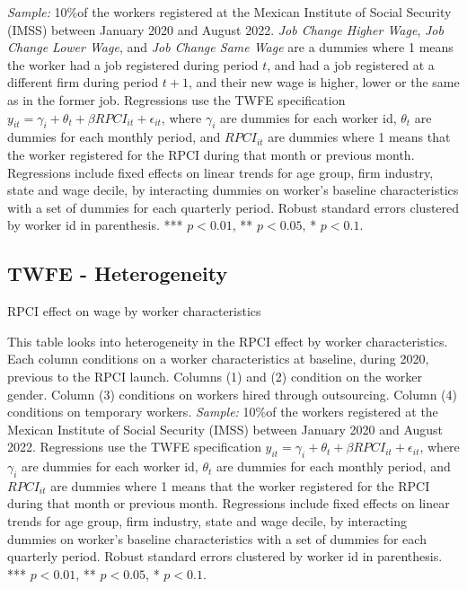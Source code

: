 \documentclass[oneside,11pt]{article}
\begin{document}
\scriptsize{
\noindent \textit{Sample:} 10\%of the workers registered at the Mexican Institute of Social Security (IMSS) between January 2020 and August 2022. \textit{Job Change Higher Wage}, \textit{Job Change Lower Wage}, and \textit{Job Change Same Wage} are a dummies where 1 means the worker had a job registered during period $t$, and had a job registered at a different firm during period $t+1$, and their new wage is higher, lower or the same as in the former job. Regressions use the TWFE specification $y_{it} = \gamma_{i} + \theta_{t}+ \beta RPCI_{it} +\epsilon_{it}$, where $\gamma_{i}$ are dummies for each worker id, $\theta_{t}$ are dummies for each monthly period, and $RPCI_{it}$ are dummies where 1 means that the worker registered for the RPCI during that month or previous month. Regressions include fixed effects on linear trends for age group, firm industry, state and wage decile, by interacting dummies on worker's baseline characteristics with a set of dummies for each quarterly period. Robust standard errors clustered by worker id in parenthesis. *** $p<0.01$, ** $p<0.05$, * $p<0.1$.
}

\clearpage

\subsection{TWFE - Heterogeneity}

\begin{table}[H]
    \caption{RPCI effect on wage by worker characteristics}
    \label{twfe_wage_hetero_wrk_char}
    \begin{center}
    \scriptsize{}
    \end{center}
\end{table}
\scriptsize{
\noindent This table looks into heterogeneity in the RPCI effect by worker characteristics. Each column conditions on a worker characteristics at baseline, during 2020, previous to the RPCI launch. Columns (1) and (2) condition on the worker gender. Column (3) conditions on workers hired through outsourcing. Column (4) conditions on temporary workers. \textit{Sample:} 10\%of the workers registered at the Mexican Institute of Social Security (IMSS) between January 2020 and August 2022. Regressions use the TWFE specification $y_{it} = \gamma_{i} + \theta_{t}+ \beta RPCI_{it} +\epsilon_{it}$, where $\gamma_{i}$ are dummies for each worker id, $\theta_{t}$ are dummies for each monthly period, and $RPCI_{it}$ are dummies where 1 means that the worker registered for the RPCI during that month or previous month. Regressions include fixed effects on linear trends for age group, firm industry, state and wage decile, by interacting dummies on worker's baseline characteristics with a set of dummies for each quarterly period. Robust standard errors clustered by worker id in parenthesis. *** $p<0.01$, ** $p<0.05$, * $p<0.1$.
}
\end{document}
